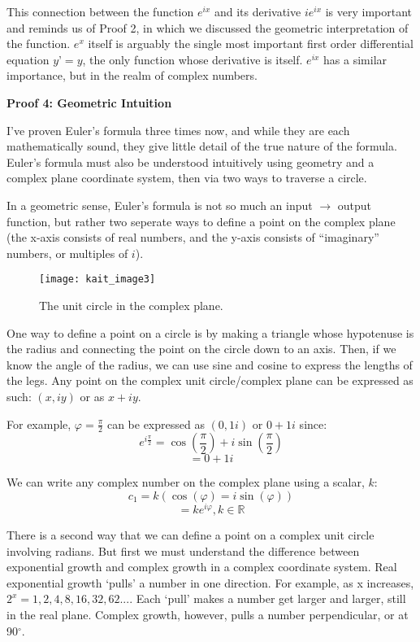 This connection between the function $e^{ix}$ and its derivative $ie^{ix}$ is very important and reminds us of Proof 2, in which we discussed the geometric interpretation of the function. $e^x$ itself is arguably the single most important first order differential equation $y’=y$, the only function whose derivative is itself. $e^{ix}$ has a similar importance, but in the realm of complex numbers.

\noindent
\textbf{Proof 4: Geometric Intuition}

I’ve proven Euler’s formula three times now, and while they are each mathematically sound, they give little detail of the true nature of the formula. Euler’s formula must also be understood intuitively using geometry and a complex plane coordinate system, then via two ways to traverse a circle. 

In a geometric sense, Euler’s formula is not so much an input $\rightarrow$ output function, but rather two seperate ways to define a point on the complex plane (the x-axis consists of real numbers, and the y-axis consists of “imaginary” numbers, or multiples of $i$).

\renewcommand{\thefigure}{3}
\begin{figure}[h]
  \begin{center}
    \texttt{[image: kait\_image3]}
  \end{center}
  \caption{The unit circle in the complex plane.}
  \label{fig:3}
\end{figure}

One way to define a point on a circle is by making a triangle whose hypotenuse is the radius and connecting the point on the circle down to an axis. Then, if we know the angle of the radius, we can use sine and cosine to express the lengths of the legs. Any point on the complex unit circle/complex plane can be expressed as such: $(x, iy)$ or as $x+iy$.

For example, $\varphi = \frac{\pi}{2}$ can be expressed as $(0, 1i)$ or $0 + 1i$ since:
\[e^{i\frac{\pi}{2}} = \cos (\frac{\pi}{2}) + i\sin (\frac{\pi}{2})\]
\[=0+1i\]

We can write any complex number on the complex plane using a scalar, $k$:
\[c_1 = k(\cos (\varphi) = i\sin (\varphi))\]
\[= ke^{i\varphi}, k \in \mathbb{R}\]

There is a second way that we can define a point on a complex unit circle involving radians. But first we must understand the difference between exponential growth and complex growth in a complex coordinate system. Real exponential growth ‘pulls’ a number in one direction. For example, as x increases, $2^x=1,2,4,8,16,32,62...$. Each ‘pull’ makes a number get larger and larger, still in the real plane. Complex growth, however, pulls a number perpendicular, or at 90$^{\circ}$. 


